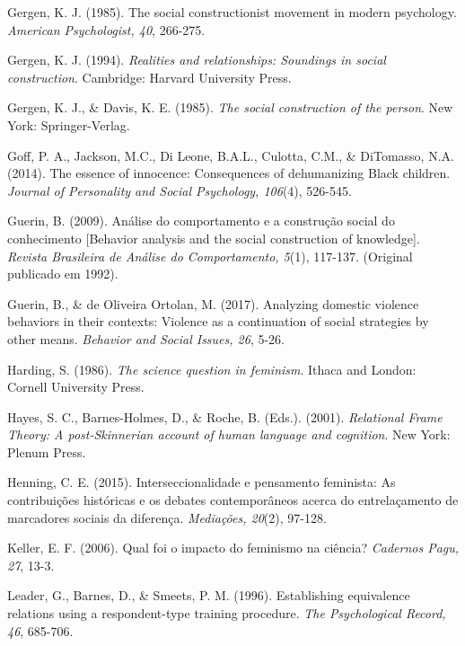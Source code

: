 \hangindent=25pt
\noindent Gergen, K. J. (1985). The social constructionist movement in modern psychology. \textit{American Psychologist, 40}, 266-275.

\hangindent=25pt
\noindent Gergen, K. J. (1994). \textit{Realities and relationships: Soundings in social construction}. Cambridge: Harvard University Press.

\hangindent=25pt
\noindent Gergen, K. J., \& Davis, K. E. (1985). \textit{The social construction of the person}. New York: Springer-Verlag. 

\hangindent=25pt
\noindent Goff, P. A., Jackson, M.C., Di Leone, B.A.L., Culotta, C.M., \& DiTomasso, N.A. (2014). The essence of innocence: Consequences of dehumanizing Black children. \textit{Journal of Personality and Social Psychology, 106}(4), 526-545.

\hangindent=25pt
\noindent Guerin, B. (2009). Análise do comportamento e a construção social do conhecimento [Behavior analysis and the social construction of knowledge]. \textit{Revista Brasileira de Análise do Comportamento, 5}(1), 117-137. (Original publicado em 1992).

\hangindent=25pt
\noindent Guerin, B., \& de Oliveira Ortolan, M. (2017). Analyzing domestic violence behaviors in their contexts: Violence as a continuation of social strategies by other means. \textit{Behavior and Social Issues, 26}, 5-26.

\hangindent=25pt
\noindent Harding, S. (1986). \textit{The science question in feminism}. Ithaca and London: Cornell University Press. 

\hangindent=25pt
\noindent Hayes, S. C., Barnes-Holmes, D., \& Roche, B. (Eds.). (2001). \textit{Relational Frame Theory: A post-Skinnerian account of human language and cognition}. New York: Plenum Press.

\hangindent=25pt
\noindent Henning, C. E. (2015). Interseccionalidade e pensamento feminista: As contribuições históricas e os debates contemporâneos acerca do entrelaçamento de marcadores sociais da diferença. \textit{Mediações, 20}(2), 97-128. 

\hangindent=25pt
\noindent Keller, E. F. (2006). Qual foi o impacto do feminismo na ciência? \textit{Cadernos Pagu, 27}, 13-3. 

\hangindent=25pt
\noindent Leader, G., Barnes, D., \& Smeets, P. M. (1996). Establishing equivalence relations using a respondent-type training procedure. \textit{The Psychological Record, 46}, 685-706.

